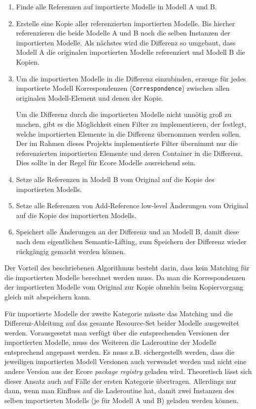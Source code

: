 \begin{enumerate}
  \item Finde alle Referenzen auf importierte Modelle in Modell A und B.
 
  \item Erstelle eine Kopie aller referenzierten importierten Modelle. Bis hierher referenzieren die
  beide Modelle A und B noch die selben Instanzen der importierten Modelle. Als nächstes wird die
  Differenz so umgebaut, dass Modell A die originalen importierten Modelle referenziert und Modell B
  die Kopien.
  
  \item Um die importierten Modelle in die Differenz einzubinden, erzeuge für jedes importierte Modell
  Korrespondenzen (\texttt{Correspondence}) zwischen allen originalen Modell-Element und denen der Kopie.
 
  Um die Differenz durch die importierten Modelle nicht unnötig groß zu machen, gibt es die
  Möglichkeit einen Filter zu implementieren, der festlegt, welche importierten Elemente in die
  Differenz übernommen werden sollen. Der im Rahmen dieses Projekts implementierte Filter übernimmt
  nur die referenzierten importierten Elemente und deren Container in die Differenz. Dies sollte in
  der Regel für Ecore Modelle ausreichend sein.
 
  \item Setze alle Referenzen in Modell B vom Original auf die Kopie des importierten Modells.
  
  \item Setze alle Referenzen von Add-Reference low-level Änderungen vom Original auf die Kopie des
  importierten Modells.
  
  \item Speichert alle Änderungen an der Differenz und an Modell B, damit diese nach dem
  eigentlichen Semantic-Lifting, zum Speichern der Differenz wieder rückgängig gemacht werden
  können.
\end{enumerate}
Der Vorteil des beschriebenen Algorithmus besteht darin, dass kein Matching für die importierten Modelle
berechnet werden muss. Da man die Korrespondenzen der importierten Modelle vom Original zur Kopie 
ohnehin beim Kopiervorgang gleich mit abspeichern kann.

Für importierte Modelle der zweite Kategorie müsste das Matching und die Differenz-Ableitung auf das
gesamte Resource-Set beider Modelle ausgeweitet werden. Vorausgesetzt man verfügt über die
entsprechenden Versionen der importierten Modelle, muss des Weiteren die Laderoutine der Modelle
entsprechend angepasst werden. Es muss z.B. sichergestellt werden, dass die jeweiligen importierten
Modell Versionen auch verwendet werden und nicht eine andere Version aus der Ecore \textit{package
registry} geladen wird. Theoretisch lässt sich dieser Ansatz auch auf Fälle der ersten Kategorie
übertragen. Allerdings nur dann, wenn man Einfluss auf die Laderoutine hat, damit zwei Instanzen
des selben importierten Modells (je für Modell A und B) geladen werden können.